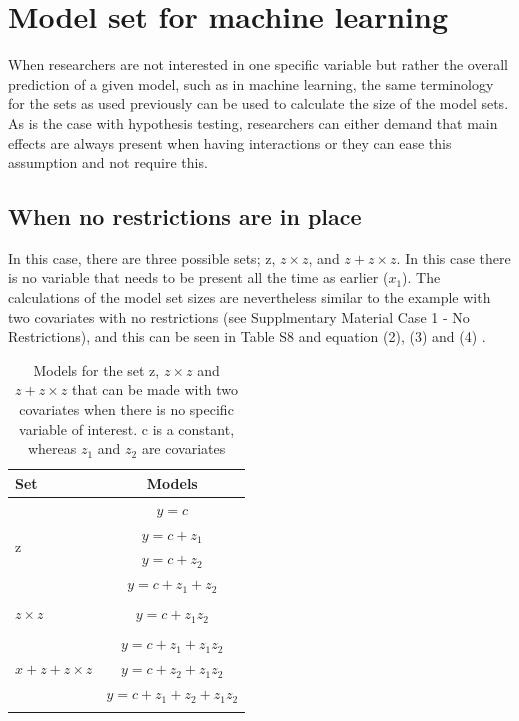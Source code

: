 




\section{Model set for machine learning}
When researchers are not interested in one specific variable but rather the overall prediction of a given model, such as in machine learning, the same terminology for the sets as used previously can be used to calculate the size of the model sets. 
As is the case with hypothesis testing, researchers can either demand that main effects are always present when having interactions or they can ease this assumption and not require this. \\

\subsection{When no restrictions are in place}
In this case, there are three possible sets; z, $z \times z$, and $ z + z \times z$. In this case there is no variable that needs to be present all the time as earlier ($x_1$). The calculations of the model set sizes are nevertheless similar to the example with two covariates with no restrictions (see Supplmentary Material Case 1 - No Restrictions), and this can be seen in Table S8 and equation (2), (3) and (4) .  

\begin{table}
\caption{Models for the set z, $z \times z$ and $ z + z \times z$ that can be made with two covariates when there is no specific variable of interest. c is a constant, whereas $z_1$ and $z_2$ are covariates}
\centering
\begin{tabular}{lc} 
\toprule
Set & Models \\ 
\midrule
\multirow{4}{*}{z} & $y=c$\\ & $y=c + z_1$\\ & $y=c + z_2$\\ & $y=c + z_1 + z_2$\\ &  \\  
\multirow{1}{*}{$z \times z$} & $y=c + z_1z_2$\\  & \\ 
\multirow{3}{*}{$x + z + z \times z$}  & $y=c + z_1 + z_1z_2$\\ & $y=c + z_2 + z_1z_2$\\ & $y=c + z_1 + z_2 + z_1z_2$\\ &  \\  
\bottomrule
\end{tabular}
\end{table}

